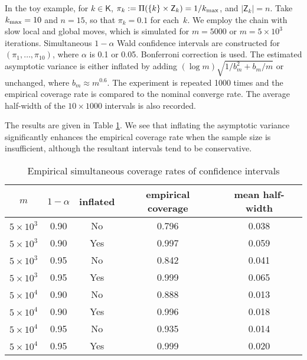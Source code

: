 \documentclass[12pt]{article}
\newcommand{\Z}{\mathsf{Z}}
\begin{document}
In the toy example, for $k \in \mathsf{K}$, $\pi_k := \Pi(\{k\} \times \Z_k) = 1/k_{\scriptsize\mbox{max}}$, and $|\Z_k| = n$.
Take $k_{\scriptsize\mbox{max}} = 10$ and $n = 15$, so that $\pi_k = 0.1$ for each~$k$.
We employ the chain with slow local and global moves, which is simulated for $m=5000$ or $m = 5 \times 10^3$ iterations.
Simultaneous $1-\alpha$ Wald confidence intervals are constructed for $(\pi_1, \dots, \pi_{10})$, where $\alpha$ is 0.1 or 0.05.
Bonferroni correction is used.
The estimated asymptotic variance is either inflated by adding $(\log m) \sqrt{1/b_m^2 + b_m/m}$ or unchanged, where $b_m \approx m^{0.6}$.
The experiment is repeated 1000 times and the empirical coverage rate is compared to the nominal converge rate.
The average half-width of the $10 \times 1000$ intervals is also recorded.

The results are given in Table \ref{tab:wald}.
We see that inflating the asymptotic variance significantly enhances the empirical coverage rate when the sample size is insufficient, although the resultant intervals tend to be conservative.


\begin{table} \caption{Empirical simultaneous coverage rates of confidence intervals}\label{tab:wald}
	\centering
	\begin{tabular}{ccccc}
			\hline
			$m$ & $1-\alpha$ & inflated & empirical coverage & mean half-width \\
			\hline
			$5 \times 10^3$  & 0.90 & No & 0.796 & 0.038 \\
			$5 \times 10^3$  & 0.90 & Yes & 0.997 & 0.059 \\
			$5 \times 10^3$  & 0.95 & No & 0.842 & 0.041 \\
			$5 \times 10^3$  & 0.95 & Yes & 0.999 & 0.065 \\
			$5 \times 10^4$  & 0.90 & No & 0.888 & 0.013 \\
			$5 \times 10^4$  & 0.90 & Yes & 0.996 & 0.018 \\
			$5 \times 10^4$  & 0.95 & No & 0.935 & 0.014 \\
			$5 \times 10^4$  & 0.95 & Yes & 0.999 & 0.020 \\
			\hline
		\end{tabular}
\end{table}
\end{document}
